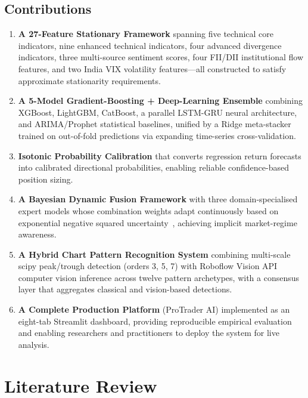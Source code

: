\documentclass[10pt,a4paper,twoside]{article}
\begin{document}
\subsection{Contributions}

\begin{enumerate}
\item \textbf{A 27-Feature Stationary Framework} spanning five technical core
  indicators, nine enhanced technical indicators, four advanced divergence
  indicators, three multi-source sentiment scores, four FII/DII institutional
  flow features, and two India VIX volatility features---all constructed to
  satisfy approximate stationarity requirements.

\item \textbf{A 5-Model Gradient-Boosting + Deep-Learning Ensemble} combining
  XGBoost, LightGBM, CatBoost, a parallel LSTM-GRU neural architecture, and
  ARIMA/Prophet statistical baselines, unified by a Ridge meta-stacker trained
  on out-of-fold predictions via expanding time-series cross-validation.

\item \textbf{Isotonic Probability Calibration} that converts regression
  return forecasts into calibrated directional probabilities, enabling reliable
  confidence-based position sizing.

\item \textbf{A Bayesian Dynamic Fusion Framework} with three domain-specialised
  expert models whose combination weights adapt continuously based on
  exponential negative squared uncertainty~\cite{gal2016}, achieving implicit
  market-regime awareness.

\item \textbf{A Hybrid Chart Pattern Recognition System} combining multi-scale
  scipy peak/trough detection (orders 3, 5, 7) with Roboflow Vision API
  computer vision inference across twelve pattern archetypes, with a consensus
  layer that aggregates classical and vision-based detections.

\item \textbf{A Complete Production Platform} (ProTrader AI) implemented as an
  eight-tab Streamlit dashboard, providing reproducible empirical evaluation and
  enabling researchers and practitioners to deploy the system for live analysis.
\end{enumerate}

\section{Literature Review}
\end{document}
